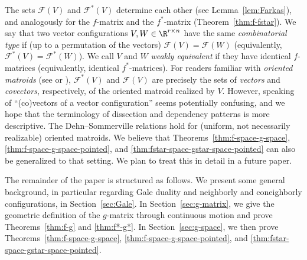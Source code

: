 \begin{remark}\label{rem:OM}
The sets $\mathcal{F}(V)$ and $\mathcal{F}^*(V)$ determine each other (see Lemma~\ref{lem:Farkas}), and analogously for the $f$-matrix and the $f^*$-matrix (Theorem~\ref{thm:f-fstar}). We say that two vector configurations $V,W \in \R^{r\times n}$ have the same \emph{combinatorial type} if (up to a permutation of the vectors) $\mathcal{F}(V)=\mathcal{F}(W)$ (equivalently,  $\mathcal{F}^*(V)=\mathcal{F}^*(W)$). We call $V$ and $W$ \emph{weakly equivalent} if they have identical $f$-matrices (equivalently, identical $f^*$-matrices).
%
For readers familiar with \emph{oriented matroids} (see \cite[Ch.~6]{Ziegler:1995aa} or \cite{Bjorner:1999aa}), $\mathcal{F}^*(V)$ and $\mathcal{F}(V)$ are precisely the sets of \emph{vectors} and \emph{covectors}, respectively, of the oriented matroid realized by $V$. However, speaking of ``(co)vectors of a vector configuration'' seems potentially confusing, and we hope that the terminology of dissection and dependency patterns is more descriptive. The Dehn--Sommerville relations hold for (uniform, not necessarily realizable) oriented matroids. We believe that Theorems~\ref{thm:f-space-g-space}, \ref{thm:f-space-g-space-pointed}, and \ref{thm:fstar-space-gstar-space-pointed} can also be generalized to that setting.
We plan to treat this in detail in a future paper.
\end{remark}
The remainder of the paper is structured as follows. We present some general background, in particular regarding Gale duality and neighborly and coneighborly configurations, in Section~\ref{sec:Gale}. In Section~\ref{sec:g-matrix}, we give the geometric definition of the $g$-matrix through continuous motion and prove Theorems~\ref{thm:f-g} and \ref{thm:f*-g*}. 
In Section~\ref{sec:g-space}, we then prove Theorems~\ref{thm:f-space-g-space}, \ref{thm:f-space-g-space-pointed}, and \ref{thm:fstar-space-gstar-space-pointed}. 
%
%
